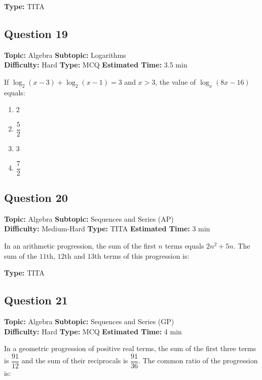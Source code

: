 \documentclass[11pt]{article}
\begin{document}
\textbf{Type:} TITA

\subsection*{Question 19}
\textbf{Topic:} Algebra \quad \textbf{Subtopic:} Logarithms \\
\textbf{Difficulty:} Hard \quad \textbf{Type:} MCQ \quad \textbf{Estimated Time:} 3.5 min

\begin{tcolorbox}
If \(\log_{2}(x-3) + \log_{2}(x-1) = 3\) and \(x > 3\), the value of \(\log_{x}(8x-16)\) equals:
\end{tcolorbox}

\begin{enumerate}[label=(\Alph*)]
    \item \(2\)
    \item \(\dfrac{5}{2}\)
    \item \(3\)
    \item \(\dfrac{7}{2}\)
\end{enumerate}

\subsection*{Question 20}
\textbf{Topic:} Algebra \quad \textbf{Subtopic:} Sequences and Series (AP) \\
\textbf{Difficulty:} Medium-Hard \quad \textbf{Type:} TITA \quad \textbf{Estimated Time:} 3 min

\begin{tcolorbox}
In an arithmetic progression, the sum of the first \(n\) terms equals \(2n^2 + 5n\). The sum of the \(11\)th, \(12\)th and \(13\)th terms of this progression is:
\end{tcolorbox}

\textbf{Type:} TITA

\subsection*{Question 21}
\textbf{Topic:} Algebra \quad \textbf{Subtopic:} Sequences and Series (GP) \\
\textbf{Difficulty:} Hard \quad \textbf{Type:} MCQ \quad \textbf{Estimated Time:} 4 min

\begin{tcolorbox}
In a geometric progression of positive real terms, the sum of the first three terms is \(\dfrac{91}{12}\) and the sum of their reciprocals is \(\dfrac{91}{36}\). The common ratio of the progression is:
\end{tcolorbox}
\end{document}
